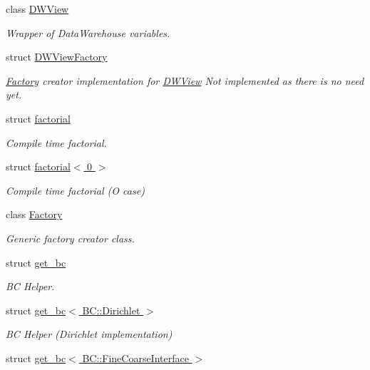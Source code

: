 \begin{DoxyCompactItemize}
class \hyperlink{classUintah_1_1PhaseField_1_1DWView}{D\+W\+View}
\begin{DoxyCompactList}\small\item\em Wrapper of Data\+Warehouse variables. \end{DoxyCompactList}\item 
struct \hyperlink{structUintah_1_1PhaseField_1_1DWViewFactory}{D\+W\+View\+Factory}
\begin{DoxyCompactList}\small\item\em \hyperlink{classUintah_1_1PhaseField_1_1Factory}{Factory} creator implementation for \hyperlink{classUintah_1_1PhaseField_1_1DWView}{D\+W\+View} Not implemented as there is no need yet. \end{DoxyCompactList}\item 
struct \hyperlink{structUintah_1_1PhaseField_1_1factorial}{factorial}
\begin{DoxyCompactList}\small\item\em Compile time factorial. \end{DoxyCompactList}\item 
struct \hyperlink{structUintah_1_1PhaseField_1_1factorial_3_010_01_4}{factorial$<$ 0 $>$}
\begin{DoxyCompactList}\small\item\em Compile time factorial (O case) \end{DoxyCompactList}\item 
class \hyperlink{classUintah_1_1PhaseField_1_1Factory}{Factory}
\begin{DoxyCompactList}\small\item\em Generic factory creator class. \end{DoxyCompactList}\item 
struct \hyperlink{structUintah_1_1PhaseField_1_1get__bc}{get\+\_\+bc}
\begin{DoxyCompactList}\small\item\em BC Helper. \end{DoxyCompactList}\item 
struct \hyperlink{structUintah_1_1PhaseField_1_1get__bc_3_01BC_1_1Dirichlet_01_4}{get\+\_\+bc$<$ B\+C\+::\+Dirichlet $>$}
\begin{DoxyCompactList}\small\item\em BC Helper (Dirichlet implementation) \end{DoxyCompactList}\item 
struct \hyperlink{structUintah_1_1PhaseField_1_1get__bc_3_01BC_1_1FineCoarseInterface_01_4}{get\+\_\+bc$<$ B\+C\+::\+Fine\+Coarse\+Interface $>$}

\end{DoxyCompactItemize}
